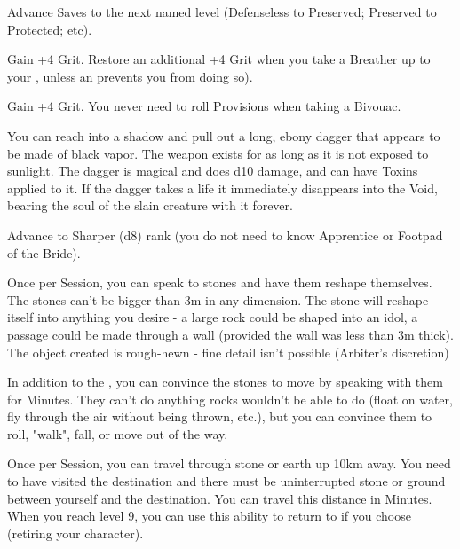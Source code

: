 \begin{multicols*}{2}
Advance  Saves to the next named level (Defenseless to Preserved; Preserved to Protected; etc).


Gain +4 \MAX Grit. Restore an additional +4 Grit when you take a Breather up to your \MAX, unless an \INJURY prevents you from doing so).



Gain +4 \MAX Grit. You never need to roll Provisions when taking a Bivouac.


You can reach into a shadow and pull out a long, ebony dagger that appears to be made of black vapor. The weapon exists for as long as it is not exposed to sunlight.  The dagger is magical and does d10 damage, and can have Toxins applied to it.  If the dagger takes a life it immediately disappears into the Void, bearing the soul of the slain creature with it forever.


Advance  to Sharper (d8) rank (you do not need to know Apprentice or Footpad of the Bride).



Once per Session, you can speak to stones and have them reshape themselves.  The stones can't be bigger than 3m in any dimension.  The stone will reshape itself into anything you desire - a large rock could be shaped into an idol, a passage could be made through a wall (provided the wall was less than 3m thick).  The object created is rough-hewn - fine detail isn't possible (Arbiter's discretion)



In addition to the , you can convince the stones to move by speaking with them for Minutes. They can't do anything rocks wouldn't be able to do (float on water, fly through the air without being thrown, etc.), but you can convince them to roll, "walk", fall, or move out of the way.


Once per Session, you can travel through stone or earth up 10km away. You need to have visited the destination and there must be uninterrupted stone or ground between yourself and the destination. You can travel this distance in Minutes. When you reach level 9, you can use this ability to return to  if you choose (retiring your character).


\end{multicols*}
